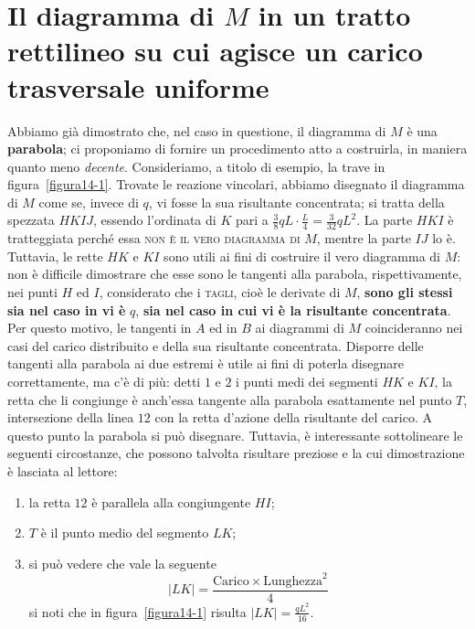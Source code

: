 \clearpage
\pagestyle{fancy}
\part{Il diagramma di $M$ in un tratto rettilineo su cui agisce un carico trasversale uniforme}
\setcounter{section}{0}
Abbiamo già dimostrato che, nel caso in questione, il diagramma di $M$ è una \textbf{parabola}; ci proponiamo di fornire un procedimento atto a costruirla, in maniera quanto meno \emph{decente}. Consideriamo, a titolo di esempio, la trave in figura~\ref{figura14-1}. Trovate le reazione vincolari, abbiamo disegnato il diagramma di $M$ come se, invece di $q$, vi fosse la sua risultante concentrata; si tratta della spezzata $HKIJ$, essendo l'ordinata di $K$ pari a $\frac{3}{8}qL \cdot \frac{L}{4} = \frac{3}{32} qL^{2}$. La parte $HKI$ è tratteggiata perché essa \textsc{non è il vero diagramma di} $M$, mentre la parte $IJ$ lo è. Tuttavia, le rette $HK$ e $KI$ sono utili ai fini di costruire il vero diagramma di $M$: non è difficile dimostrare che esse sono le tangenti alla parabola, rispettivamente, nei punti $H$ ed $I$, considerato che i \textsc{tagli}, cioè le derivate di $M$, \textbf{sono gli stessi sia nel caso in vi è} $q$, \textbf{sia nel caso in cui vi è la risultante concentrata}. Per questo motivo, le tangenti in $A$ ed in $B$ ai diagrammi di $M$ coincideranno nei casi del carico distribuito e della sua risultante concentrata. Disporre delle tangenti alla parabola ai due estremi è utile ai fini di poterla disegnare correttamente, ma c'è di più: detti $1$ e $2$ i punti medi dei segmenti $HK$ e $KI$, la retta che li congiunge è anch'essa tangente alla parabola esattamente nel punto $T$, intersezione della linea $12$ con la retta d'azione della risultante del carico. A questo punto la parabola si può disegnare. Tuttavia, è interessante sottolineare le seguenti circostanze, che possono talvolta risultare preziose e la cui dimostrazione è lasciata al lettore: 
\begin{enumerate}
\item la retta $12$ è parallela alla congiungente $HI$; 
\item $T$ è il punto medio del segmento $LK$; 
\item si può vedere che vale la seguente 
	\begin{equation*}
		\big| LK \big| = \frac{ \text{Carico} \times \text{Lunghezza}^{2} }{ 4 }
	\end{equation*}
si noti che in figura~\ref{figura14-1} risulta $\big| LK \big| = \frac{qL^{2}}{16}$.
\end{enumerate}
